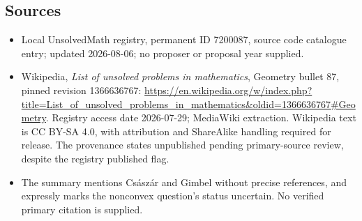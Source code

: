 \documentclass[11pt]{article}
\begin{document}
\subsection{Sources}
\begin{itemize}
\item Local UnsolvedMath registry, permanent ID 7200087, source code catalogue entry; updated 2026-08-06; no proposer or proposal year supplied.
\item Wikipedia, \emph{List of unsolved problems in mathematics}, Geometry bullet 87, pinned revision 1366636767: \url{https://en.wikipedia.org/w/index.php?title=List_of_unsolved_problems_in_mathematics&oldid=1366636767#Geometry}. Registry access date 2026-07-29; MediaWiki extraction. Wikipedia text is CC BY-SA 4.0, with attribution and ShareAlike handling required for release. The provenance states unpublished pending primary-source review, despite the registry published flag.
\item The summary mentions Cs\'asz\'ar and Gimbel without precise references, and expressly marks the nonconvex question's status uncertain. No verified primary citation is supplied.
\end{itemize}
\end{document}
